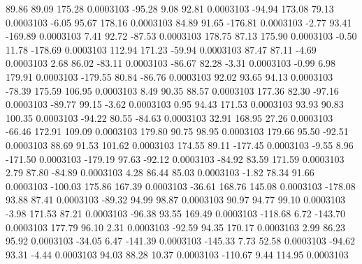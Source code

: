        89.86       89.09      175.28     0.0003103
      -95.28        9.08       92.81     0.0003103
      -94.94      173.08       79.13     0.0003103
       -6.05       95.67      178.16     0.0003103
       84.89       91.65     -176.81     0.0003103
       -2.77       93.41     -169.89     0.0003103
        7.41       92.72      -87.53     0.0003103
      178.75       87.13      175.90     0.0003103
       -0.50       11.78     -178.69     0.0003103
      112.94      171.23      -59.94     0.0003103
       87.47       87.11       -4.69     0.0003103
        2.68       86.02      -83.11     0.0003103
      -86.67       82.28       -3.31     0.0003103
       -0.99        6.98      179.91     0.0003103
     -179.55       80.84      -86.76     0.0003103
       92.02       93.65       94.13     0.0003103
      -78.39      175.59      106.95     0.0003103
        8.49       90.35       88.57     0.0003103
      177.36       82.30      -97.16     0.0003103
      -89.77       99.15       -3.62     0.0003103
        0.95       94.43      171.53     0.0003103
       93.93       90.83      100.35     0.0003103
      -94.22       80.55      -84.63     0.0003103
       32.91      168.95       27.26     0.0003103
      -66.46      172.91      109.09     0.0003103
      179.80       90.75       98.95     0.0003103
      179.66       95.50      -92.51     0.0003103
       88.69       91.53      101.62     0.0003103
      174.55       89.11     -177.45     0.0003103
       -9.55        8.96     -171.50     0.0003103
     -179.19       97.63      -92.12     0.0003103
      -84.92       83.59      171.59     0.0003103
        2.79       87.80      -84.89     0.0003103
        4.28       86.44       85.03     0.0003103
       -1.82       78.34       91.66     0.0003103
     -100.03      175.86      167.39     0.0003103
      -36.61      168.76      145.08     0.0003103
     -178.08       93.88       87.41     0.0003103
      -89.32       94.99       98.87     0.0003103
       90.97       94.77       99.10     0.0003103
       -3.98      171.53       87.21     0.0003103
      -96.38       93.55      169.49     0.0003103
     -118.68        6.72     -143.70     0.0003103
      177.79       96.10        2.31     0.0003103
      -92.59       94.35      170.17     0.0003103
        2.99       86.23       95.92     0.0003103
      -34.05        6.47     -141.39     0.0003103
     -145.33        7.73       52.58     0.0003103
      -94.62       93.31       -4.44     0.0003103
       94.03       88.28       10.37     0.0003103
     -110.67        9.44      114.95     0.0003103
